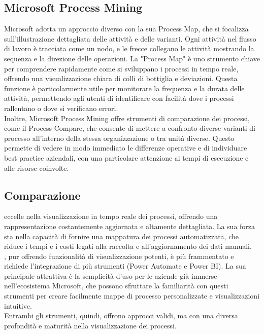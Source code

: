 \documentclass{article}
\newcommand{\custombold}{\contour{black}}
\begin{document}
\subsection{Microsoft Process Mining}
Microsoft adotta un approccio diverso con la sua Process Map, che si focalizza sull'illustrazione dettagliata delle attività e delle varianti. Ogni attività nel flusso di lavoro è tracciata come un nodo, e le frecce collegano le attività mostrando la sequenza e la direzione delle operazioni. La "Process Map" è uno strumento chiave per comprendere rapidamente come si sviluppano i processi in tempo reale, offrendo una visualizzazione chiara di colli di bottiglia e deviazioni. Questa funzione è particolarmente utile per monitorare la frequenza e la durata delle attività, permettendo agli utenti di identificare con facilità dove i processi rallentano o dove si verificano errori.\\
Inoltre, Microsoft Process Mining offre strumenti di comparazione dei processi, come il Process Compare, che consente di mettere a confronto diverse varianti di processo all'interno della stessa organizzazione o tra unità diverse. Questo permette di vedere in modo immediato le differenze operative e di individuare best practice aziendali, con una particolare attenzione ai tempi di esecuzione e alle risorse coinvolte.\\

\subsection{Comparazione}
\custombold{Celonis} eccelle nella visualizzazione in tempo reale dei processi, offrendo una rappresentazione costantemente aggiornata e altamente dettagliata. La sua forza sta nella capacità di fornire una mappatura dei processi automatizzata, che riduce i tempi e i costi legati alla raccolta e all'aggiornamento dei dati manuali.\\
\custombold{Microsoft}, pur offrendo funzionalità di visualizzazione potenti, è più frammentato e richiede l'integrazione di più strumenti (Power Automate e Power BI). La sua principale attrattiva è la semplicità d'uso per le aziende già immerse nell'ecosistema Microsoft, che possono sfruttare la familiarità con questi strumenti per creare facilmente mappe di processo personalizzate e visualizzazioni intuitive.\\
Entrambi gli strumenti, quindi, offrono approcci validi, ma con una diversa profondità e maturità nella visualizzazione dei processi.
\end{document}
